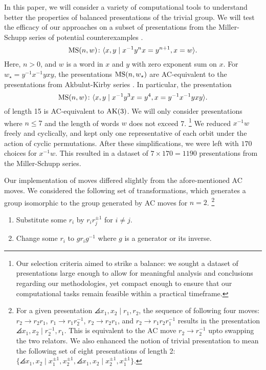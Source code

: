 In this paper, we will consider a variety of computational tools to understand better the properties of balanced presentations of the trivial group. We will test the efficacy of our approaches on a subset of presentations from the Miller-Schupp series of potential counterexamples \cite{Miller-Schupp}.
\[
\text{MS}(n, w) \colon \langle x, y \mid x^{-1} y^n x = y^{n+1}, x = w\rangle.
\]
Here, $n > 0$, and $w$ is a word in $x$ and $y$ with zero exponent sum on $x$. For $w_\star = y^{-1} x^{-1} y x y$, the presentations $\text{MS}(n, w_\star)$ are AC-equivalent to the presentations from Akbulut-Kirby series \cite{MMS}. In particular, the presentation
\[
\text{MS}(n, w) \colon \langle x, y \mid x^{-1} y^3 x = y^{4}, x =  y^{-1} x^{-1} y x y\rangle.
\]
of length 15 is AC-equivalent to $\text{AK}(3)$. We will only consider presentations where $n \leq 7$ and the length of words $w$ does not exceed 7.
\footnote{Our selection criteria aimed to strike a balance: we sought a dataset of presentations large enough to allow for meaningful analysis and conclusions regarding our methodologies, yet compact enough to ensure that our computational tasks remain feasible within a practical timeframe.}
We reduced $x^{-1}w$ freely and cyclically, and kept only one representative of each orbit under the action of cyclic permutations. After these simplifications, we were left with $170$ choices for $x^{-1} w$. This resulted in a dataset of $7 \times 170 = 1190$ presentations from the Miller-Schupp series.
\newline

Our implementation of moves differed slightly from the afore-mentioned AC moves.  We considered the following set of transformations, which generates a group isomorphic to the group generated by AC moves for $n=2$.
\footnote{For a given presentation $\angles{x_1, x_2 \mid r_1, r_2}$, the sequence of following four moves: $r_2 \to r_2 r_1$, $r_1 \to r_1 r_2^{-1}$, $r_2 \to r_2 r_1$, and $r_2 \to r_1 r_2 r_1^{-1}$ results in the presentation $\angles{x_1, x_2 \mid r_2^{-1}, r_1}$. This is equivalent to the AC move $r_2 \to r_2^{-1}$ upto swapping the two relators. We also enhanced the notion of trivial presentation to mean the following set of eight presentations of length 2: $\{\angles{x_1, x_2 \mid x_1^{\pm 1}, x_2^{\pm 1}} , \angles{x_1, x_2 \mid x_2^{\pm 1}, x_1^{\pm 1}}  \}$.}
\begin{enumerate}
	\item Substitute some $r_i$ by $r_i r_j^{\pm 1}$ for $i \neq j$.
	\item Change some $r_i$ to $g r_i g^{-1}$ where $g$ is a generator or its inverse.
\end{enumerate}

